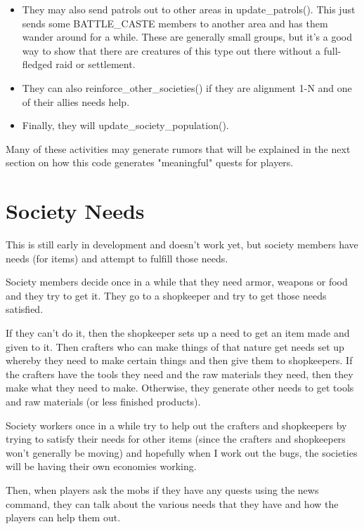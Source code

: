 \begin{itemize}
\item They may also send patrols out to other areas in update\_patrols().
This just sends some BATTLE\_CASTE members to another area and
has them wander around for a while. These are generally small groups,
but it's a good way to show that there are creatures of this type out
there without a full-fledged raid or settlement.

\item They can also reinforce\_other\_societies() if they are alignment 
1-N and one of their allies needs help.

\item Finally, they will update\_society\_population().

\end{itemize}

Many of these activities may generate rumors that will be explained
in the next section on how this code generates "meaningful" quests
for players.

\section{Society Needs}

This is still early in development and doesn't work yet, but society 
members have needs (for items) and attempt to fulfill those needs.

Society members decide once in a while that they need armor, weapons
or food and they try to get it. They go to a shopkeeper and try to
get those needs satisfied.

If they can't do it, then the shopkeeper sets up a need to get
an item made and given to it. Then crafters who can make things
of that nature get needs set up whereby they need to make certain
things and then give them to shopkeepers. If the crafters have
the tools they need and the raw materials they need, then they
make what they need to make. Otherwise, they generate other needs
to get tools and raw materials (or less finished products).

Society workers once in a while try to help out the crafters
and shopkeepers by trying to satisfy their needs for other items
(since the crafters and shopkeepers won't generally be moving)
and hopefully when I work out the bugs, the societies will be
having their own economies working. 

Then, when players ask the mobs if they have any quests using the
news command, they can talk about the various needs that they
have and how the players can help them out. 

